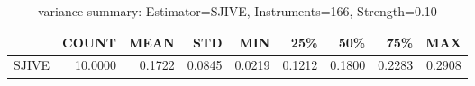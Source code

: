 \begin{table}[ht]
\centering
\caption{variance summary: Estimator=SJIVE, Instruments=166, Strength=0.10}
\begin{tabular}{lrrrrrrrr}
\toprule
 & COUNT & MEAN & STD & MIN & 25\% & 50\% & 75\% & MAX \\
\midrule
SJIVE & 10.0000 & 0.1722 & 0.0845 & 0.0219 & 0.1212 & 0.1800 & 0.2283 & 0.2908 \\
\bottomrule
\end{tabular}
\end{table}
